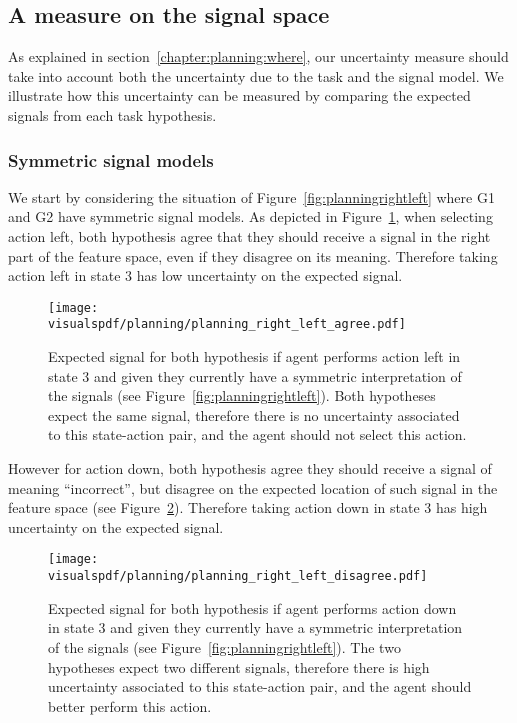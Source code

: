 \subsection{A measure on the signal space}
\label{chapter:planning:uncertaintysignalspace}

As explained in section~\ref{chapter:planning:where}, our uncertainty measure should take into account both the uncertainty due to the task and the signal model. We illustrate how this uncertainty can be measured by comparing the expected signals from each task hypothesis.

\subsubsection*{Symmetric signal models}

We start by considering the situation of Figure~\ref{fig:planningrightleft} where G1 and G2 have symmetric signal models. As depicted in Figure~\ref{fig:uncertaintysignalrightleftagree}, when selecting action left, both hypothesis agree that they should receive a signal in the right part of the feature space, even if they disagree on its meaning. Therefore taking action left in state 3 has low uncertainty on the expected signal.

\begin{figure}[!p]
  \centering
  \texttt{[image: \\visualspdf/planning/planning\_right\_left\_agree.pdf]}
  \caption{Expected signal for both hypothesis if agent performs action left in state 3 and given they currently have a symmetric interpretation of the signals (see Figure~\ref{fig:planningrightleft}). Both hypotheses expect the same signal, therefore there is no uncertainty associated to this state-action pair, and the agent should not select this action.}
  \label{fig:uncertaintysignalrightleftagree}
\end{figure}

However for action down, both hypothesis agree they should receive a signal of meaning ``incorrect'', but disagree on the expected location of such signal in the feature space (see Figure~\ref{fig:uncertaintysignalrightleftdisagree}). Therefore taking action down in state 3 has high uncertainty on the expected signal.


\begin{figure}[!p]
  \centering
  \texttt{[image: \\visualspdf/planning/planning\_right\_left\_disagree.pdf]}
  \caption{Expected signal for both hypothesis if agent performs action down in state 3 and given they currently have a symmetric interpretation of the signals (see Figure~\ref{fig:planningrightleft}). The two hypotheses expect two different signals, therefore there is high uncertainty associated to this state-action pair, and the agent should better perform this action.}
  \label{fig:uncertaintysignalrightleftdisagree}
\end{figure}

